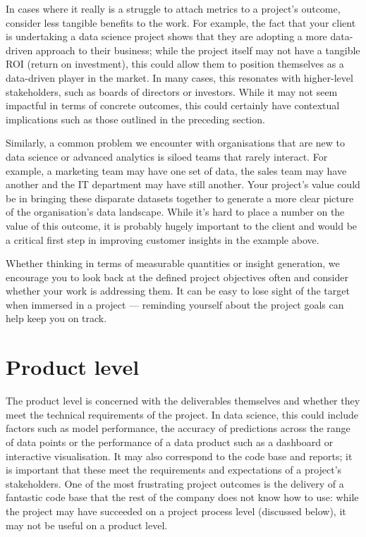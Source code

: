 \documentclass[]{book}
\begin{document}
In cases where it really is a struggle to attach metrics to a project's
outcome, consider less tangible benefits to the work. For example, the
fact that your client is undertaking a data science project shows that
they are adopting a more data-driven approach to their business; while
the project itself may not have a tangible ROI (return on investment),
this could allow them to position themselves as a data-driven player in
the market. In many cases, this resonates with higher-level
stakeholders, such as boards of directors or investors. While it may not
seem impactful in terms of concrete outcomes, this could certainly have
contextual implications such as those outlined in the preceding section.

Similarly, a common problem we encounter with organisations that are new
to data science or advanced analytics is siloed teams that rarely
interact. For example, a marketing team may have one set of data, the
sales team may have another and the IT department may have still
another. Your project's value could be in bringing these disparate
datasets together to generate a more clear picture of the organisation's
data landscape. While it's hard to place a number on the value of this
outcome, it is probably hugely important to the client and would be a
critical first step in improving customer insights in the example above.

Whether thinking in terms of measurable quantities or insight
generation, we encourage you to look back at the defined project
objectives often and consider whether your work is addressing them. It
can be easy to lose sight of the target when immersed in a project ---
reminding yourself about the project goals can help keep you on track.

\hypertarget{product-level}{%
\section{Product level}\label{product-level}}

The product level is concerned with the deliverables themselves and
whether they meet the technical requirements of the project. In data
science, this could include factors such as model performance, the
accuracy of predictions across the range of data points or the
performance of a data product such as a dashboard or interactive
visualisation. It may also correspond to the code base and reports; it
is important that these meet the requirements and expectations of a
project's stakeholders. One of the most frustrating project outcomes is
the delivery of a fantastic code base that the rest of the company does
not know how to use: while the project may have succeeded on a project
process level (discussed below), it may not be useful on a product
level.
\end{document}
